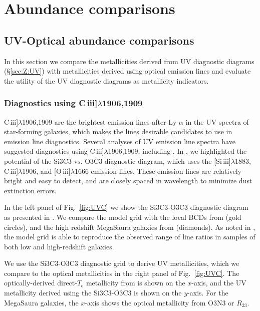 \documentclass[preprint2]{aastex62}
\newcommand{\oiii}{[O\,{\sc iii}]\xspace}
\newcommand{\SiuIII}{[Si\,{\sc iii}]\xspace}
\newcommand{\ciii}{C\,{\sc iii}]\xspace}
\newcommand\vs{\ensuremath{\mathrm{vs.}}\xspace}
\newcommand{\mage}{{\sc Meg}a{\sc S}a{\sc ura}\xspace}
\newcommand{\Te}{\ensuremath{T_{\mathrm{e}}}\xspace}
\begin{document}
\section{Abundance comparisons}\label{sec:ZZ}

\subsection{UV-Optical abundance comparisons}\label{sec:ZZ:UVOpt}

In this section we compare the metallicities derived from UV diagnostic diagrams (\S\ref{sec:Z:UV}) with metallicities derived using optical emission lines and evaluate the utility of the UV diagnostic diagrams as metallicity indicators.

\subsubsection{Diagnostics using \ciii$\lambda$1906,1909}\label{sec:ZZ:UVOpt:C}

\ciii$\lambda$1906,1909 are the brightest emission lines after Ly-$\alpha$ in the UV spectra of star-forming galaxies, which makes the lines desirable candidates to use in emission line diagnostics. Several analyses of UV emission line spectra have suggested diagnostics using \ciii$\lambda$1906,1909, including \citet{Feltre+2016, Jaskot+2016, Byler+2018}. In \citet{Byler+2018}, we highlighted the potential of the Si3C3 \vs O3C3 diagnostic diagram, which uses the \SiuIII$\lambda$1883, \ciii$\lambda$1906, and \oiii$\lambda$1666 emission lines. These emission lines are relatively bright and easy to detect, and are closely spaced in wavelength to minimize dust extinction errors.

In the left panel of Fig.~\ref{fig:UVC} we show the Si3C3-O3C3 diagnostic diagram as presented in \citet{Byler+2018}. We compare the model grid with the local BCDs from \citet{Berg+2016} (gold circles), and the high redshift \mage galaxies from \citet{Rigby+2018b} (diamonds). As noted in \citet{Byler+2018}, the model grid is able to reproduce the observed range of line ratios in samples of both low and high-redshift galaxies.

We use the Si3C3-O3C3 diagnostic grid to derive UV metallicities, which we compare to the optical metallicities in the right panel of Fig.~\ref{fig:UVC}. The optically-derived direct-\Te metallicity from \citet{Berg+2016} is shown on the $x$-axis, and the UV metallicity derived using the Si3C3-O3C3 is shown on the $y$-axis. For the \mage galaxies, the $x$-axis shows the optical metallicity from O3N3 or $R_{23}$.
\end{document}
